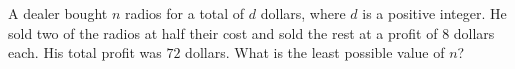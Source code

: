 A dealer bought $n$ radios for a total of $d$ dollars, where $d$ is a positive integer. He sold two of the radios at half their cost and sold the rest at a profit of $8$ dollars each. His total profit was $72$ dollars. What is the least possible value of $n$?
